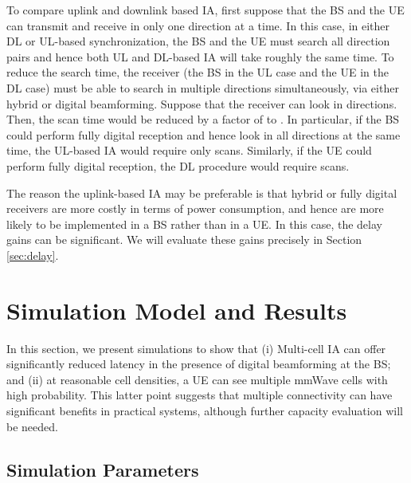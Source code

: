 \documentclass[conference,a4paper]{IEEEtran}
\begin{document}
To compare uplink and downlink based IA, first suppose that the BS and the UE
can transmit and receive in only one direction at a time.  In this case, in either
DL or UL-based synchronization, the BS and the UE must search all  
direction pairs and hence both UL and DL-based IA will take roughly the same time.
To reduce the search time, the receiver (the BS in the UL case
and the UE in the DL case) must be able to search in multiple directions simultaneously,
via either hybrid or digital beamforming.  Suppose that the receiver can 
look in  directions.  Then, the scan time would be reduced by a factor
of  to .  In particular, if the BS could perform fully digital reception
and hence look in all  directions at the same time, the UL-based IA would require
only  scans.  Similarly, if the UE could perform fully digital reception, 
the DL procedure would require  scans.  

The reason the uplink-based IA may be preferable is that hybrid or fully digital 
receivers are more costly in terms of power consumption, and hence are more likely to be implemented
in a BS rather than in a UE.  In this case, the delay gains can be significant.
We will evaluate these gains precisely in Section \ref{sec:delay}.








\section{Simulation Model and Results}
\label{sec:res}

In this section, we present simulations to show that
(i) Multi-cell IA can offer significantly reduced latency
in the presence of digital beamforming at the BS; and 
(ii) at reasonable cell densities, a UE can see multiple mmWave cells with high probability.
This latter point suggests that multiple connectivity can have significant benefits in practical systems,
although further capacity evaluation will be needed.

\subsection{Simulation Parameters}
\end{document}
